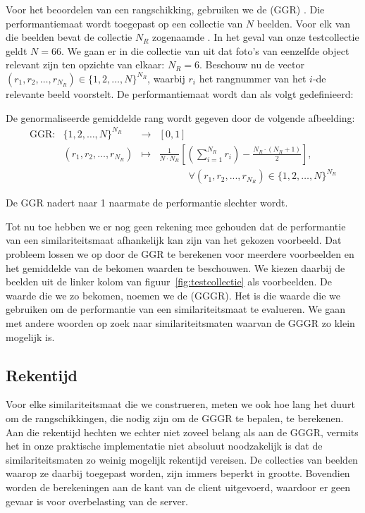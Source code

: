 Voor het beoordelen van een rangschikking, gebruiken we de  
(GGR) \cite{muller:perf_eval}. Die performantiemaat wordt toegepast op een collectie
van $N$ beelden. Voor elk van die beelden bevat de collectie
$N_R$ zogenaamde . In het geval van onze testcollectie geldt $N = 66$.
We gaan er in die collectie van uit dat foto's van eenzelfde object relevant zijn ten opzichte
van elkaar: $N_R = 6$. Beschouw nu de vector 
$(r_1,r_2,\ldots,r_{N_R}) \in \{1,2,\ldots,N\}^{N_R}$, waarbij $r_i$ het
rangnummer van het $i$-de relevante beeld voorstelt. De performantiemaat
wordt dan als volgt gedefinieerd:
\begin{definitie}
De genormaliseerde gemiddelde rang wordt gegeven door de volgende afbeelding:
\begin{displaymath}
\begin{array}{lrcl}
\textrm{GGR}: 	& \{1,2,\ldots,N\}^{N_R} & \to 	& [0,1] \\
		& (r_1,r_2,\ldots,r_{N_R}) & \mapsto &
	{\displaystyle\frac{1}{N \cdot N_R}\left[ \left(\sum_{i=1}^{N_R}r_i\right) - \frac{N_R \cdot (N_R + 1)}{2} \right]},\\[15pt]
	& & & \qquad \quad \forall (r_1, r_2, ..., r_{N_R}) \in \{1,2,\ldots,N\}^{N_R}
\end{array}
\end{displaymath}
\end{definitie}
\noindent
De GGR nadert naar 1 naarmate de performantie slechter wordt.

Tot nu toe hebben we er nog geen rekening mee gehouden dat de performantie van
een similariteitsmaat afhankelijk kan zijn van het gekozen voorbeeld. Dat probleem lossen we
op door de GGR te berekenen voor meerdere voorbeelden en het gemiddelde van de bekomen waarden
te beschouwen. We kiezen daarbij de beelden uit de linker kolom van 
figuur~\ref{fig:testcollectie} als voorbeelden. De waarde die we zo bekomen, noemen we de
(GGGR). Het is die waarde die we gebruiken
om de performantie van een similariteitsmaat te evalueren. We gaan met andere woorden op
zoek naar similariteitsmaten waarvan de GGGR zo klein mogelijk is.

\subsection{Rekentijd}
\label{sectie:rekentijd}

Voor elke similariteitsmaat die we construeren, meten we ook hoe lang het duurt om
de rangschikkingen, die nodig zijn om de GGGR te bepalen, te berekenen. Aan die 
rekentijd hechten we echter niet zoveel belang als aan de GGGR, vermits het in onze
praktische implementatie niet absoluut noodzakelijk is dat de similariteitsmaten zo weinig
mogelijk rekentijd vereisen. De collecties van beelden waarop ze daarbij toegepast worden,
zijn immers beperkt in grootte. Bovendien worden de berekeningen aan de kant van de client
uitgevoerd, waardoor er geen gevaar is voor overbelasting van de server.

